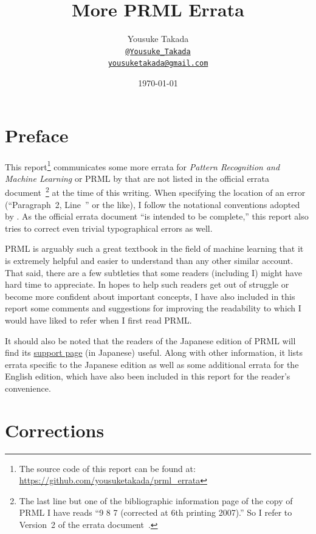 \documentclass[12pt,a4paper]{article}
\makeatletter
\newcommand{\email}[1]{\href{mailto:#1}{\texttt{#1}}}
\newcommand{\twitter}[1]{\href{https://twitter.com/#1}{\texttt{@#1}}}
\makeatother
\begin{document}
\title{More PRML Errata}
\author{Yousuke Takada \\ \twitter{Yousuke\_Takada} \\ \email{yousuketakada@gmail.com}}
\date{\today}
\maketitle

\section*{Preface}
This report\footnote{The source code of this report can be found at:
\url{https://github.com/yousuketakada/prml\_errata}}
communicates some more errata for \emph{Pattern Recognition and Machine Learning} or
PRML by \citet*{Bishop:PRML}
that are not listed in the official errata document~\citep{Svensen:PRML_errata}\footnote{%
The last line but one of the bibliographic information page of the copy of PRML I have
reads ``9 8 7 (corrected at 6th printing 2007).''
So I refer to Version~2 of the errata document~\citep{Svensen:PRML_errata}.}
at the time of this writing.
When specifying the location of an error (``Paragraph~2, Line~'' or the like),
I follow the notational conventions adopted by
\citet{Svensen:PRML_errata}.
As the official errata document ``is intended to be complete,''
this report also tries to correct even trivial typographical errors as well.

PRML is arguably such a great textbook in the field of machine learning
that it is extremely helpful and easier to understand than any other similar account.
That said, there are a few subtleties
that some readers (including I) might have hard time to appreciate.
In hopes to help such readers get out of struggle or
become more confident about important concepts,
I have also included in this report some comments and suggestions for improving the readability
to which I would have liked to refer when I first read PRML.

It should also be noted that the readers of the Japanese edition of PRML will find its
\href{http://ibisforest.org/index.php?PRML}{support page} (in Japanese) useful.
Along with other information,
it lists errata specific to the Japanese edition as well as
some additional errata for the English edition,
which have also been included in this report for the reader's convenience.

\section*{Corrections}
\end{document}
